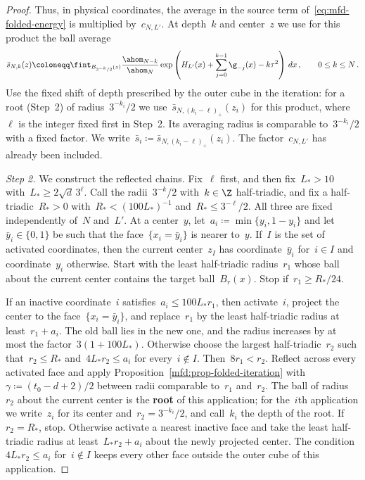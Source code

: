 \documentclass[11pt]{amsart}
\begin{document}
\begin{proof}
\smallskip

Thus, in physical coordinates, the average in the source term of~\eqref{eq:mfd-folded-energy} is multiplied by~$c_{N,L'}$. At depth~$k$ and center~$z$ we use for this product the ball average
\begin{equation*}
	\bar s_{N,k}(z)\coloneqq\fint_{B_{3^{-k}/2}(z)}
	\frac{\ahom_{N-k}}{\ahom_N}
	\exp\left(H_{L'}(x)+\sum_{j=0}^{k-1}\g_{-j}(x)-k\tau^2\right)\,dx\,,
	\qquad 0\leq k\leq N\,.
\end{equation*}
Use the fixed shift of depth prescribed by the outer cube in the iteration: for a root (Step~2) of radius~$3^{-k_i}/2$ we use~$\bar s_{N,(k_i-\ell)_+}(z_i)$ for this product, where~$\ell$ is the integer fixed first in Step~2. Its averaging radius is comparable to~$3^{-k_i}/2$ with a fixed factor. We write~$\bar s_i\coloneqq \bar s_{N,(k_i-\ell)_+}(z_i)$. The factor~$c_{N,L'}$ has already been included.

\smallskip

\emph{Step 2.} We construct the reflected chains. Fix~$\ell$ first, and then fix~$L_*>10$ with~$L_*\geq2\sqrt d\,3^\ell$. Call the radii~$3^{-k}/2$ with~$k\in\Z$ half-triadic, and fix a half-triadic~$R_*>0$ with~$R_*<(100L_*)^{-1}$ and~$R_*\leq3^{-\ell}/2$. All three are fixed independently of~$N$ and~$L'$. At a center~$y$, let~$a_i\coloneqq\min\{y_i,1-y_i\}$ and let~$\bar y_i\in\{0,1\}$ be such that the face~$\{x_i=\bar y_i\}$ is nearer to~$y$. If~$I$ is the set of activated coordinates, then the current center~$z_I$ has coordinate~$\bar y_i$ for~$i\in I$ and coordinate~$y_i$ otherwise. Start with the least half-triadic radius~$r_1$ whose ball about the current center contains the target ball~$B_r(x)$. Stop if~$r_1\geq R_*/24$.

\smallskip

If an inactive coordinate~$i$ satisfies~$a_i\leq100L_*r_1$, then activate~$i$, project the center to the face~$\{x_i=\bar y_i\}$, and replace~$r_1$ by the least half-triadic radius at least~$r_1+a_i$. The old ball lies in the new one, and the radius increases by at most the factor~$3(1+100L_*)$. Otherwise choose the largest half-triadic~$r_2$ such that~$r_2\leq R_*$ and~$4L_*r_2\leq a_i$ for every~$i\notin I$. Then~$8r_1<r_2$. Reflect across every activated face and apply Proposition~\ref{mfd:prop-folded-iteration} with~$\gamma\coloneqq(t_0-d+2)/2$ between radii comparable to~$r_1$ and~$r_2$. The ball of radius~$r_2$ about the current center is the \textbf{root} of this application; for the~$i$th application we write~$z_i$ for its center and~$r_2=3^{-k_i}/2$, and call~$k_i$ the depth of the root. If~$r_2=R_*$, stop. Otherwise activate a nearest inactive face and take the least half-triadic radius at least~$L_*r_2+a_i$ about the newly projected center. The condition~$4L_*r_2\leq a_i$ for~$i\notin I$ keeps every other face outside the outer cube of this application.


\end{proof}
\end{document}
